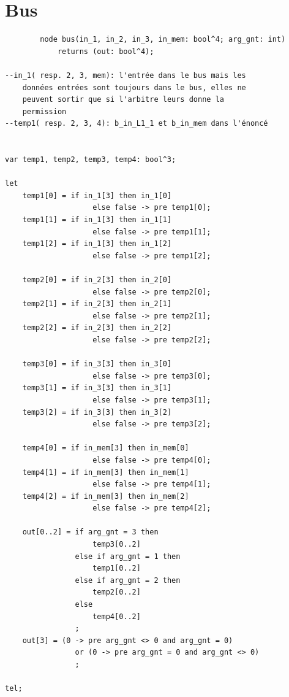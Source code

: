 \documentclass[a4paper,11pt]{report}
\begin{document}
\chapter{Bus}
	\begin{framed}
		\begin{verbatim}
		node bus(in_1, in_2, in_3, in_mem: bool^4; arg_gnt: int) 
			returns (out: bool^4);

--in_1( resp. 2, 3, mem): l'entrée dans le bus mais les 
	données entrées sont toujours dans le bus, elles ne 
	peuvent sortir que si l'arbitre leurs donne la 
	permission
--temp1( resp. 2, 3, 4): b_in_L1_1 et b_in_mem dans l'énoncé


var temp1, temp2, temp3, temp4: bool^3;

let
    temp1[0] = if in_1[3] then in_1[0]
                    else false -> pre temp1[0];
    temp1[1] = if in_1[3] then in_1[1]
                    else false -> pre temp1[1];
    temp1[2] = if in_1[3] then in_1[2]
                    else false -> pre temp1[2];

    temp2[0] = if in_2[3] then in_2[0]
                    else false -> pre temp2[0];
    temp2[1] = if in_2[3] then in_2[1]
                    else false -> pre temp2[1];
    temp2[2] = if in_2[3] then in_2[2]
                    else false -> pre temp2[2];

    temp3[0] = if in_3[3] then in_3[0]
                    else false -> pre temp3[0];
    temp3[1] = if in_3[3] then in_3[1]
                    else false -> pre temp3[1];
    temp3[2] = if in_3[3] then in_3[2]
                    else false -> pre temp3[2];

    temp4[0] = if in_mem[3] then in_mem[0]
                    else false -> pre temp4[0];
    temp4[1] = if in_mem[3] then in_mem[1]
                    else false -> pre temp4[1];
    temp4[2] = if in_mem[3] then in_mem[2]
                    else false -> pre temp4[2];

    out[0..2] = if arg_gnt = 3 then
                    temp3[0..2]
                else if arg_gnt = 1 then
                    temp1[0..2]
                else if arg_gnt = 2 then
                    temp2[0..2]
                else
                    temp4[0..2]
                ;
    out[3] = (0 -> pre arg_gnt <> 0 and arg_gnt = 0)
                or (0 -> pre arg_gnt = 0 and arg_gnt <> 0)
                ;

tel;
		\end{verbatim}
	\end{framed}
	
\end{document}

